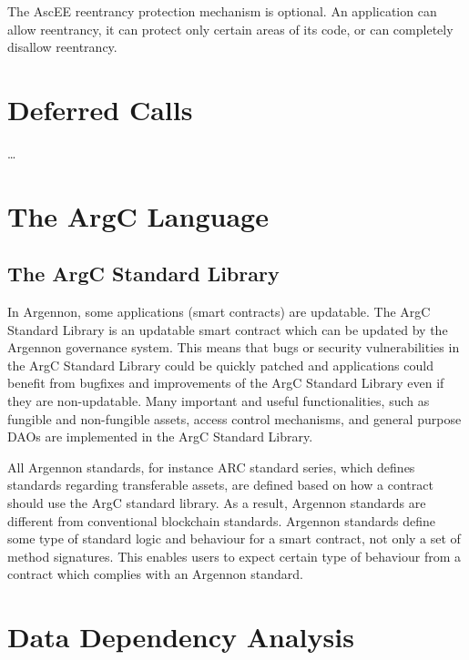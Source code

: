 The AscEE reentrancy protection mechanism is optional. An application can allow reentrancy, it can protect only certain
areas of its code, or can completely disallow reentrancy.


\section{Deferred Calls}\label{sec:deferred-calls}

\ldots



\section{The ArgC Language}\label{sec:the-argc-language}
\subsection{The ArgC Standard Library}\label{sec:asl}

In Argennon, some applications (smart contracts) are updatable. The ArgC Standard Library is an updatable smart
contract which can be updated by the Argennon governance
system. This means that bugs or security vulnerabilities in the ArgC Standard Library could be quickly patched and
applications could benefit from bugfixes and improvements of the ArgC Standard Library even if they are
non-updatable. Many important and useful functionalities,
such as fungible and non-fungible assets, access control mechanisms,
and general purpose DAOs are implemented in the ArgC Standard Library.

All Argennon standards, for instance ARC standard series, which defines standards regarding transferable assets,
are defined based on how a contract should use the ArgC standard library. As a result, Argennon standards are
different from conventional blockchain standards. Argennon standards define some type of standard logic and
behaviour for a smart contract, not only a set of method signatures. This enables users to expect certain type
of behaviour from a contract which complies with an Argennon standard.


\section{Data Dependency Analysis}\label{sec:concurrency}
